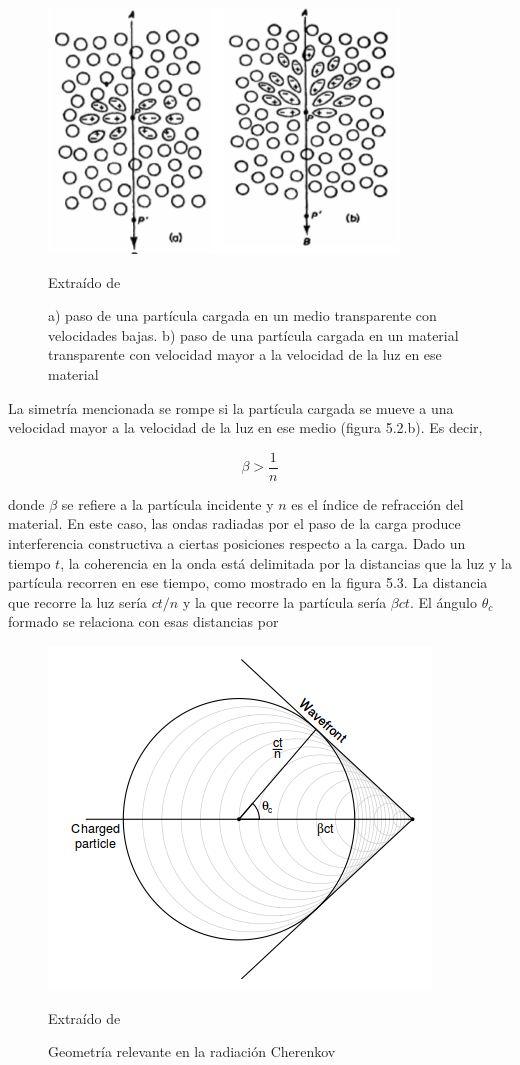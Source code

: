 \documentclass{book}
\begin{document}
\begin{figure}[ht] %
\begin{center}
 \includegraphics[width = 0.5\linewidth]{Pol1.png}
 
 Extra\'ido de \citep{GROUPENS}
\caption{a) paso de una part\'icula cargada en un medio transparente con velocidades bajas. b) paso de una part\'icula cargada en un material transparente con velocidad mayor a la velocidad de la luz en ese material}
\end{center}
\end{figure}

La simetr\'ia mencionada se rompe si la part\'icula cargada se mueve a una velocidad mayor a la velocidad de la luz en ese medio (figura 5.2.b). Es decir,

\begin{equation}
\beta > \frac{1}{n}
\end{equation}

donde $\beta$ se refiere a la part\'icula incidente y $n$ es el \'indice de refracci\'on del material. En este caso, las ondas radiadas por el paso de la carga produce interferencia constructiva a ciertas posiciones respecto a la carga. Dado un tiempo $t$, la coherencia en la onda est\'a delimitada por la distancias que la luz y la part\'icula recorren en ese tiempo, como mostrado en la figura 5.3. La distancia que recorre la luz ser\'ia $ct/n$ y la que recorre la part\'icula ser\'ia $\beta ct$. El \'angulo $\theta_c$ formado se relaciona con esas distancias por

\begin{figure}[ht] %
\begin{center}
 \includegraphics[width = 0.5\linewidth]{GeometriaCherenkov.png}
 
 Extra\'ido de \citep{BALDINI}
\caption{Geometr\'ia relevante en la radiaci\'on Cherenkov}
\end{center}
\end{figure}
\end{document}
